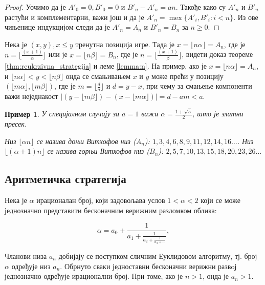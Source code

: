 \documentclass[a4paper]{article}
\newtheorem{example}{Пример}
\DeclareMathOperator{\mex}{mex}
\begin{document}
\begin{proof}
	Уочимо да је $ A'_{0} = 0, B'_{0} = 0 $ и $ B'_{n} - A'_{n} = an $. Такође како су $ A'_{n} $ и $ B'_{n} $ растући и комплементарни, важи још и да је $ A'_{n} = \mex \{ A'_{i}, B'_{i} : i < n \} $. Из ове чињенице индукцијом следи да је $ A'_{n} = A_{n} $ и $ B'_{n} = B_{n}  $ за $ n \ge 0 $.
\end{proof}

Нека је $ (x, y), x \leq y $ тренутна позиција игре. Тада је $ x = \lfloor n \alpha \rfloor = A_{n} $, где је $ n = \lfloor \frac{(x+1)}{\alpha} \rfloor $ или је $ x = \lfloor n \beta \rfloor = B_{n} $, где је $ n = \lfloor \frac{(x+1)}{\beta} \rfloor $, видети доказ теореме \ref{thm:reukrzivna_strategija} и леме \ref{lemma:n}. На пример, ако је $ x = \lfloor n \alpha \rfloor = A_{n} $, и $ \lfloor n \alpha \rfloor < y < \lfloor n \beta \rfloor $ онда се смањивањем $ x $ и $ y $ може прећи у позицију $ (\lfloor m \alpha \rfloor, \lfloor m \beta \rfloor) $, где је $ m = \lfloor \frac{d}{a} \rfloor $ и $ d = y - x $, при чему за смањење компоненти важи неједнакост $ |(y - \lfloor m \beta \rfloor) - (x - \lfloor m \alpha \rfloor)| = d - am < a $.

\begin{example}
	У специјалном случају за $ a = 1 $ важи $ \alpha = \frac{1 + \sqrt{5}}{2} $, што је златни пресек.
	
	Низ $ \lfloor \alpha n \rfloor $ се назива доњи Витхофов низ ($ A_{n} $):
	$ 1, 3, 4, 6, 8, 9, 11, 12, 14, 16 \ldots $. Низ $ \lfloor (\alpha + 1) n \rfloor $ се назива горњи Витхофов низ ($ B_{n} $):
	$ 2, 5, 7, 10, 13, 15, 18, 20, 23, 26 \ldots $
\end{example}

\subsection{Аритметичка стратегија}

Нека је $ \alpha $ ирационалан број, који задовољава услов $ 1 < \alpha < 2 $ који се може једнозначно представити бесконачним верижним разломком облика:

\begin{displaymath}
	\alpha = a_{0} + \frac{1}{a_{1} + \frac{1}{a_{2} + \frac{1}{a_{3} + \ldots}}},
\end{displaymath}

Чланови низа $ a_{n} $ добијају се поступком сличним Еуклидовом алгоритму, тј. број $ \alpha $ одређује низ $ a_{n} $. Обрнуто сваки једноставни бесконачни верижни развoј једнозначно одређује ирационални број. При томе, ако је $ n > 1 $, онда је $ a_{n} > 1 $.
\end{document}
